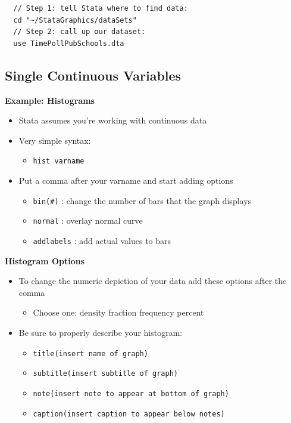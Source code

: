 \documentclass[]{book}
\providecommand{\tightlist}{%
  \setlength{\itemsep}{0pt}\setlength{\parskip}{0pt}}
\begin{document}
\begin{verbatim}
  // Step 1: tell Stata where to find data:
  cd "~/StataGraphics/dataSets"
  // Step 2: call up our dataset:
  use TimePollPubSchools.dta
\end{verbatim}

\hypertarget{single-continuous-variables}{%
\subsection{Single Continuous Variables}\label{single-continuous-variables}}

\textbf{Example: Histograms}

\begin{itemize}
\tightlist
\item
  Stata assumes you're working with continuous data
\item
  Very simple syntax:

  \begin{itemize}
  \tightlist
  \item
    \texttt{hist\ varname}
  \end{itemize}
\item
  Put a comma after your varname and start adding options

  \begin{itemize}
  \tightlist
  \item
    \texttt{bin(\#)} : change the number of bars that the graph displays
  \item
    \texttt{normal} : overlay normal curve
  \item
    \texttt{addlabels} : add actual values to bars
  \end{itemize}
\end{itemize}

\textbf{Histogram Options}

\begin{itemize}
\tightlist
\item
  To change the numeric depiction of your data add these options after the comma

  \begin{itemize}
  \tightlist
  \item
    Choose one: density fraction frequency percent
  \end{itemize}
\item
  Be sure to properly describe your histogram:

  \begin{itemize}
  \tightlist
  \item
    \texttt{title(insert\ name\ of\ graph)}
  \item
    \texttt{subtitle(insert\ subtitle\ of\ graph)}
  \item
    \texttt{note(insert\ note\ to\ appear\ at\ bottom\ of\ graph)}
  \item
    \texttt{caption(insert\ caption\ to\ appear\ below\ notes)}
  \end{itemize}
\end{itemize}
\end{document}
